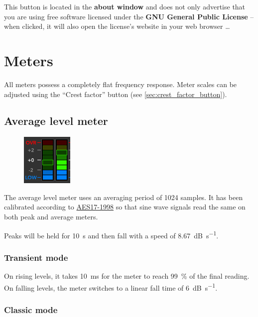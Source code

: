 This button is located in the \textbf{about window} and does not only
advertise that you are using free software licensed under the
\textbf{GNU General Public License} -- when clicked, it will also open
the license's website in your web browser \dots

\chapter{Meters}
\label{chap:meters}

All meters possess a completely flat frequency response.  Meter scales
can be adjusted using the ``Crest factor'' button (see
\ref{sec:crest_factor_button}).

\section{Average level meter}

\begin{figure}
\includegraphics[scale=\screenshotscale,clip]{include/images/level_meter_average.png}
\end{figure}

The average level meter uses an averaging period of \num{1024}
samples.  It has been calibrated according to
\href{http://www.aes.org/publications/standards/search.cfm?docID=21}{AES17-1998}
so that sine wave signals read the same on both peak and average
meters.

Peaks will be held for \SI{10}{\second} and then fall with a speed of
\SI{8.67}{\dB\per\second}.

\subsection{Transient mode}

On rising levels, it takes \SI{10}{\milli\second} for the meter to
reach \SI{99}{\percent} of the final reading.  On falling levels, the
meter switches to a linear fall time of \SI{6}{\dB\per\second}.

\subsection{Classic mode}

